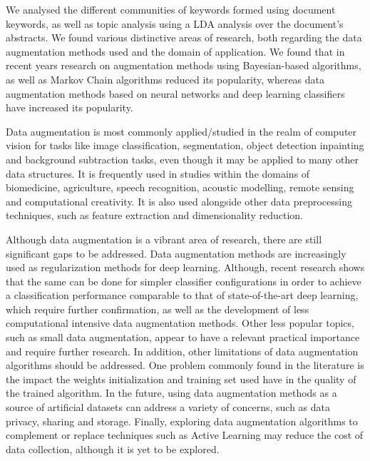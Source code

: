\documentclass[parskip=full]{scrartcl}
\begin{document}
We analysed the different communities of keywords formed using document
keywords, as well as topic analysis using a LDA analysis over the document's
abstracts. We found various distinctive areas of research, both regarding the
data augmentation methods used and the domain of application. We found that in
recent years research on augmentation methods using Bayesian-based algorithms,
as well as Markov Chain algorithms reduced its popularity, whereas data
augmentation methods based on neural networks and deep learning classifiers
have increased its popularity.

Data augmentation is most commonly applied/studied in the realm of computer
vision for tasks like image classification, segmentation, object detection
inpainting and background subtraction tasks, even though it may be applied to
many other data structures. It is frequently used in studies within the
domains of biomedicine, agriculture, speech recognition, acoustic modelling,
remote sensing and computational creativity. It is also used alongside other
data preprocessing techniques, such as feature extraction and dimensionality
reduction.

Although data augmentation is a vibrant area of research, there are still
significant gaps to be addressed. Data augmentation methods are increasingly
used as regularization methods for deep learning. Although, recent research
shows that the same can be done for simpler classifier configurations in order
to achieve a classification performance comparable to that of state-of-the-art
deep learning, which require further confirmation, as well as the development
of less computational intensive data augmentation methods. Other less popular
topics, such as small data augmentation, appear to have a relevant practical
importance and require further research. In addition, other limitations of
data augmentation algorithms should be addressed. One problem commonly found
in the literature is the impact the weights initialization and training set
used have in the quality of the trained algorithm. In the future, using data
augmentation methods as a source of artificial datasets can address a variety
of concerns, such as data privacy, sharing and storage. Finally, exploring
data augmentation algorithms to complement or replace techniques such as
Active Learning may reduce the cost of data collection, although it is yet to
be explored.



\end{document}
